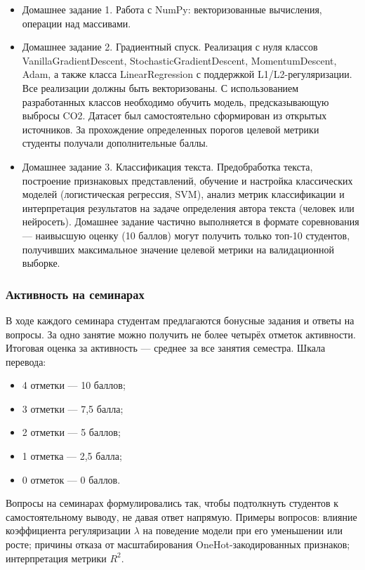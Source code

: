 \begin{itemize}
    \item Домашнее задание 1. Работа с NumPy: векторизованные вычисления, операции над массивами.
    \item Домашнее задание 2. Градиентный спуск. Реализация с нуля классов VanillaGradientDescent, StochasticGradientDescent, MomentumDescent, Adam, а также класса LinearRegression с поддержкой L1/L2-регуляризации. Все реализации должны быть векторизованы. С использованием разработанных классов необходимо обучить модель, предсказывающую выбросы CO2. Датасет был самостоятельно сформирован из открытых источников. За прохождение определенных порогов целевой метрики студенты получали дополнительные баллы.
    \item Домашнее задание 3. Классификация текста. Предобработка текста, построение признаковых представлений, обучение и настройка классических моделей (логистическая регрессия, SVM), анализ метрик классификации и интерпретация результатов на задаче определения автора текста (человек или нейросеть). Домашнее задание частично выполняется в формате соревнования --- наивысшую оценку (10 баллов) могут получить только топ-10 студентов, получивших максимальное значение целевой метрики на валидационной выборке.
\end{itemize}

\subsubsection{Активность на семинарах}

В ходе каждого семинара студентам предлагаются бонусные задания и ответы на вопросы. За одно занятие можно получить не более четырёх отметок активности. Итоговая оценка за активность --- среднее за все занятия семестра. Шкала перевода:

\begin{itemize}
    \item 4 отметки --- 10 баллов;
    \item 3 отметки --- 7,5 балла;
    \item 2 отметки --- 5 баллов;
    \item 1 отметка --- 2,5 балла;
    \item 0 отметок --- 0 баллов.
\end{itemize}

Вопросы на семинарах формулировались так, чтобы подтолкнуть студентов к самостоятельному выводу, не давая ответ напрямую. Примеры вопросов: влияние коэффициента регуляризации $\lambda$ на поведение модели при его уменьшении или росте; причины отказа от масштабирования OneHot-закодированных признаков; интерпретация метрики $R^2$.

